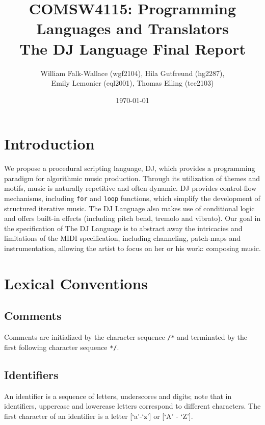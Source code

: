 \documentclass[letterpaper]{article}
\author{William Falk-Wallace (wgf2104), Hila Gutfreund (hg2287), \\Emily Lemonier (eql2001), Thomas Elling (tee2103)}
\title{COMSW4115: Programming Languages and Translators\\The DJ Language Final Report}
\date{\today}
\begin{document}
\maketitle
\tableofcontents 
\pagebreak[4]

\section{Introduction}
We propose a procedural scripting language, DJ, which provides a programming paradigm for algorithmic music production. Through its utilization of themes and motifs, music is naturally repetitive and often dynamic. DJ provides control-flow mechanisms, including \texttt{for} and \texttt{loop} functions, which simplify the development of structured iterative music. The DJ Language also makes use of conditional logic and offers built-in effects (including pitch bend, tremolo and vibrato).
Our goal in the specification of The DJ Language is to abstract away the intricacies and limitations of the MIDI specification, including channeling, patch-maps and instrumentation, allowing the artist to focus on her or his work: composing music.

\section{Lexical Conventions}

\subsection{Comments} 
Comments are initialized by the character sequence \texttt{/*} and terminated by the first following character sequence \texttt{*/}.

\subsection{Identifiers}
An identifier is a sequence of letters, underscores and digits; note that in identifiers, uppercase and lowercase letters correspond to different characters. The first character of an identifier is a letter [`a'-`z'] or [`A' - `Z'].
\end{document}
